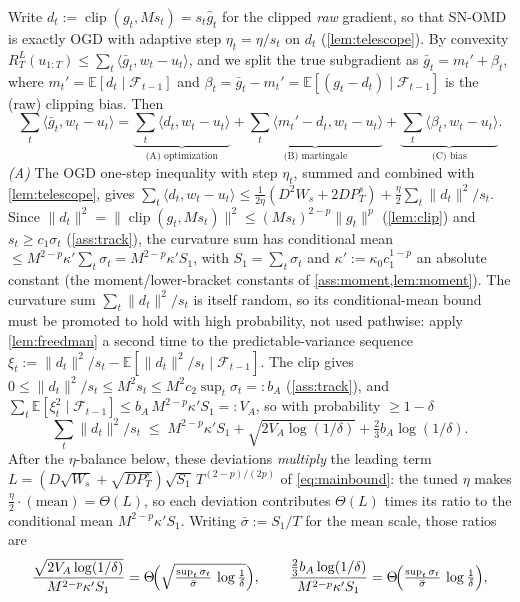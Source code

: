 \documentclass{article}
\newcommand{\E}{\mathbb{E}}
\newcommand{\ip}[2]{\langle #1, #2 \rangle}
\newcommand{\norm}[1]{\lVert #1 \rVert}
\newcommand{\gt}{g_t}
\newcommand{\clip}{\operatorname{clip}}
\begin{document}
Write $d_t:=\clip(\gt,Ms_t)=s_t\hat g_t$ for the clipped \emph{raw} gradient, so that
SN-OMD is exactly OGD with adaptive step $\eta_t=\eta/s_t$ on $d_t$
(\cref{lem:telescope}). By convexity $R_T^L(u_{1:T})\le\sum_t\ip{\bar g_t}{w_t-u_t}$, and
we split the true subgradient as $\bar g_t=m_t'+\beta_t$, where
$m_t'=\E[d_t\mid\mathcal F_{t-1}]$ and $\beta_t=\bar g_t-m_t'=\E[(\gt-d_t)\mid
\mathcal F_{t-1}]$ is the (raw) clipping bias. Then
\begin{equation*}
\sum_t\ip{\bar g_t}{w_t-u_t}
=\underbrace{\sum_t\ip{d_t}{w_t-u_t}}_{\text{(A) optimization}}
+\underbrace{\sum_t\ip{m_t'-d_t}{w_t-u_t}}_{\text{(B) martingale}}
+\underbrace{\sum_t\ip{\beta_t}{w_t-u_t}}_{\text{(C) bias}}.
\end{equation*}
\emph{(A)} The OGD one-step inequality with step $\eta_t$, summed and combined with
\cref{lem:telescope}, gives
$\sum_t\ip{d_t}{w_t-u_t}\le\tfrac{1}{2\eta}(D^2W_s+2D P_T^s)+\tfrac{\eta}{2}
\sum_t\norm{d_t}^2/s_t$. Since $\norm{d_t}^2=\norm{\clip(\gt,Ms_t)}^2\le
(Ms_t)^{2-p}\norm{\gt}^p$ (\cref{lem:clip}) and $s_t\ge c_1\sigma_t$
(\cref{ass:track}), the curvature sum has conditional mean
$\le M^{2-p}\kappa'\sum_t\sigma_t=M^{2-p}\kappa'S_1$, with $S_1=\sum_t\sigma_t$ and
$\kappa'{:=}\kappa_0 c_1^{1-p}$ an absolute constant (the moment/lower-bracket constants of
\cref{ass:moment,lem:moment}). The curvature sum $\sum_t\norm{d_t}^2/s_t$ is itself random,
so its conditional-mean bound must be promoted to hold with high probability, not used
pathwise: apply \cref{lem:freedman} a second time to the predictable-variance sequence
$\xi_t:=\norm{d_t}^2/s_t-\E[\norm{d_t}^2/s_t\mid\mathcal F_{t-1}]$. The clip gives
$0\le\norm{d_t}^2/s_t\le M^2 s_t\le M^2 c_2\sup_t\sigma_t=:b_A$ (\cref{ass:track}), and
$\sum_t\E[\xi_t^2\mid\mathcal F_{t-1}]\le b_A\,M^{2-p}\kappa'S_1=:V_A$, so with probability
$\ge1-\delta$
\[
  \sum_t\norm{d_t}^2/s_t\;\le\;M^{2-p}\kappa'S_1
   +\sqrt{2V_A\log(1/\delta)}+\tfrac{2}{3}b_A\log(1/\delta).
\]
After the $\eta$-balance below, these deviations \emph{multiply} the leading term
$L=(D\sqrt{W_s}+\sqrt{D P_T^s})\sqrt{S_1}\,T^{(2-p)/(2p)}$ of \eqref{eq:mainbound}: the tuned
$\eta$ makes $\tfrac{\eta}{2}\cdot(\text{mean})=\Theta(L)$, so each deviation contributes
$\Theta(L)$ times its ratio to the conditional mean $M^{2-p}\kappa'S_1$. Writing
$\bar\sigma:=S_1/T$ for the mean scale, those ratios are
\[
\frac{\sqrt{2V_A\log(1/\delta)}}{M^{2-p}\kappa'S_1}
 =\Theta\!\Bigl(\sqrt{\tfrac{\sup_t\sigma_t}{\bar\sigma}\,\log\tfrac1\delta}\Bigr),
\qquad
\frac{\tfrac23 b_A\log(1/\delta)}{M^{2-p}\kappa'S_1}
 =\Theta\!\Bigl(\tfrac{\sup_t\sigma_t}{\bar\sigma}\,\log\tfrac1\delta\Bigr),
\]
\end{document}

